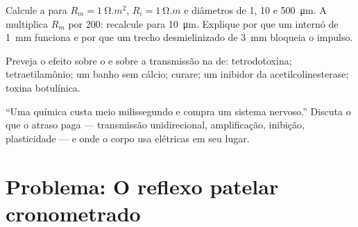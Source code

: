 \begin{exercise}[$\star\star\star$]\label{exo:b2:neurons-synapses:10}
Calcule a  para $R_m = \qty{1}{\ohm.m^2}$, $R_i =
\qty{1}{\ohm.m}$ e diâmetros de 1, 10 e \qty{500}{\micro m}. A 
multiplica $R_m$ por 200: recalcule para \qty{10}{\micro m}. Explique
por que um internó de \qty{1}{mm} funciona e por que um trecho
desmielinizado de \qty{3}{mm} bloqueia o impulso.
\end{exercise}

\begin{exercise}[$\star\star\star$]\label{exo:b2:neurons-synapses:11}
Preveja o efeito sobre o  e sobre a transmissão na
 de: tetrodotoxina; tetraetilamônio; um banho sem
cálcio; curare; um inibidor da acetilcolinesterase; toxina botulínica.
\end{exercise}

\begin{exercise}[$\star\star\star$]\label{exo:b2:neurons-synapses:12}
``Uma  química custa meio milissegundo e compra um sistema
nervoso.'' Discuta o que o atraso paga --- transmissão unidirecional,
amplificação, inibição, plasticidade --- e onde o corpo usa 
elétricas em seu lugar.
\end{exercise}

\section{Problema: O reflexo patelar cronometrado}

